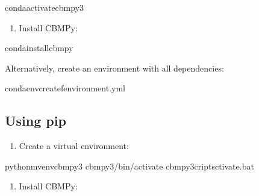 \documentclass[letterpaper,12pt,english]{sphinxmanual}
\begin{document}
\begin{sphinxVerbatim}[commandchars=\\\{\}]
condaactivatecbmpy3
\end{sphinxVerbatim}
\begin{enumerate}
%
\setcounter{enumi}{2}
\item {} 
\sphinxAtStartPar
Install CBMPy:

\end{enumerate}

\begin{sphinxVerbatim}[commandchars=\\\{\}]
condainstallcbmpy
\end{sphinxVerbatim}

\sphinxAtStartPar
Alternatively, create an environment with all dependencies:

\begin{sphinxVerbatim}[commandchars=\\\{\}]
condaenvcreate\PYGZhy{}fenvironment.yml
\end{sphinxVerbatim}


\subsection{Using pip}
\label{\detokenize{installation:using-pip}}\begin{enumerate}
%
\item {} 
\sphinxAtStartPar
Create a virtual environment:

\end{enumerate}

\begin{sphinxVerbatim}[commandchars=\\\{\}]
python\PYGZhy{}mvenvcbmpy3
cbmpy3/bin/activate
cbmpy3criptsctivate.bat
\end{sphinxVerbatim}
\begin{enumerate}
%
\setcounter{enumi}{1}
\item {} 
\sphinxAtStartPar
Install CBMPy:

\end{enumerate}
\end{document}
